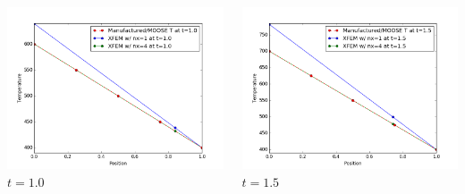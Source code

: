 \documentclass[]{beamer}
\begin{document}
\begin{frame}[t]
\begin{columns}
\begin{center}
			\includegraphics[scale=0.17]{figures/1D_xy_ls1m/1D_xy_ls1mat_u_vs_x_10}\\
			$t=1.0$
			\end{center}
			\begin{center}
			\includegraphics[scale=0.17]{figures/1D_xy_ls1m/1D_xy_ls1mat_u_vs_x_15}\\
			$t=1.5$			
			
			\null
			

\end{center}
\end{columns}
\end{frame}
\end{document}
